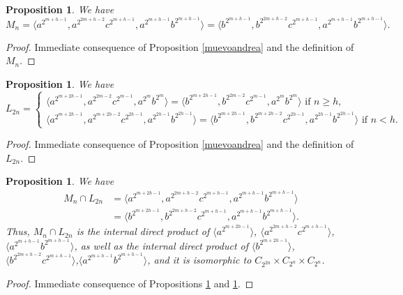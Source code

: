 \documentclass{amsart}
\newtheorem{prop}[theorem]{Proposition}
\theoremstyle{definition}
\theoremstyle{remark}
\begin{document}
{\begin{prop}\label{muevoandrea2} We have
$$
M_n=\langle a^{2^{m+h-1}}, a^{2^{2m+h-2}}c^{2^{m+h-1}}, a^{2^{m+h-1}}b^{2^{m+h-1}}\rangle=
\langle b^{2^{m+h-1}}, b^{2^{2m+h-2}}c^{2^{m+h-1}}, a^{2^{m+h-1}}b^{2^{m+h-1}}\rangle.
$$
\end{prop}

\begin{proof} Immediate consequence of Proposition \ref{muevoandrea} and the definition of $M_n$.
\end{proof}

\begin{prop}\label{muevoandrea3} We have
$$
L_{2n}=\begin{cases} \langle a^{2^{m+2h-1}}, a^{2^{2m-2}}c^{2^{m-1}},a^{2^{m}}b^{2^{m}}\rangle=
\langle b^{2^{m+2h-1}}, b^{2^{2m-2}}c^{2^{m-1}},a^{2^{m}}b^{2^{m}}
\rangle\text{ if }n\geq h,\\
\langle a^{2^{m+2h-1}}, a^{2^{m+2h-2}}c^{2^{2h-1}},a^{2^{2h-1}}b^{2^{2h-1}}\rangle=\langle 
b^{2^{m+2h-1}}, b^{2^{m+2h-2}}c^{2^{2h-1}},a^{2^{2h-1}}b^{2^{2h-1}}
\rangle\text{ if }n<h.
\end{cases}
$$
\end{prop}

\begin{proof} Immediate consequence of Proposition \ref{muevoandrea} and the definition of $L_{2n}$.
\end{proof}


\begin{prop}\label{mlndos} We have
$$
\begin{aligned}
M_n\cap L_{2n} &=\langle a^{2^{m+2h-1}}, a^{2^{2m+h-2}}c^{2^{m+h-1}},a^{2^{m+h-1}}b^{2^{m+h-1}}\rangle\\
&=\langle b^{2^{m+2h-1}}, b^{2^{2m+h-2}}c^{2^{m+h-1}},a^{2^{m+h-1}}b^{2^{m+h-1}}\rangle.
\end{aligned}
$$
Thus, $M_n\cap L_{2n}$ is the internal direct product of 
$\langle a^{2^{m+2h-1}}\rangle$, $\langle a^{2^{2m+h-2}}c^{2^{m+h-1}}\rangle$,$\langle a^{2^{m+h-1}}b^{2^{m+h-1}}\rangle$,
as well as the internal direct product of  
$\langle b^{2^{m+2h-1}}\rangle$, $\langle b^{2^{2m+h-2}}c^{2^{m+h-1}}\rangle$,$\langle a^{2^{m+h-1}}b^{2^{m+h-1}}\rangle$,
and it is isomorphic to $C_{2^{2n}}\times  C_{2^{n}}\times C_{2^{n}}$.
\end{prop}

\begin{proof} Immediate consequence of Propositions \ref{muevoandrea2} and \ref{muevoandrea3}.
\end{proof}


}
\end{document}

